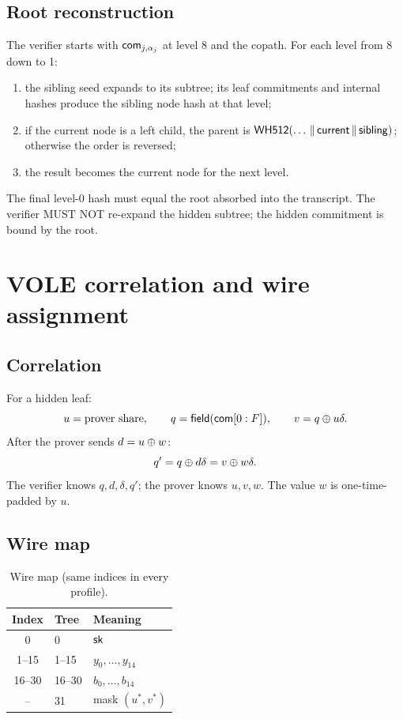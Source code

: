 \documentclass[11pt,a4paper]{article}
\begin{document}
\subsection{Root reconstruction}

The verifier starts with $\mathsf{com}_{j,\alpha_j}$ at level 8 and the copath. For
each level from 8 down to 1:
\begin{enumerate}
  \item the sibling seed expands to its subtree; its leaf commitments and
        internal hashes produce the sibling node hash at that level;
  \item if the current node is a left child, the parent is
        $\mathsf{WH512}(\ldots\,\|\,\mathsf{current}\,\|\,\mathsf{sibling})$;
        otherwise the order is reversed;
  \item the result becomes the current node for the next level.
\end{enumerate}
The final level-0 hash must equal the root absorbed into the transcript.
The verifier MUST NOT re-expand the hidden subtree; the hidden commitment is
bound by the root.

\section{VOLE correlation and wire assignment}

\subsection{Correlation}

For a hidden leaf:
\[
u=\text{prover share},\qquad
q=\mathsf{field}(\mathsf{com}[0:F]),\qquad
v=q\oplus u\delta.
\]
After the prover sends $d=u\oplus w$:
\[
q'=q\oplus d\delta=v\oplus w\delta.
\]
The verifier knows $q,d,\delta,q'$; the prover knows $u,v,w$. The value $w$ is
one-time-padded by $u$.

\subsection{Wire map}

\begin{table}[ht]
\centering
\small
\caption{Wire map (same indices in every profile).}
\label{tab:wiremap}
\begin{tabular}{@{}cll@{}}
\toprule
Index & Tree & Meaning \\
\midrule
0 & 0 & $\mathsf{sk}$ \\
1--15 & 1--15 & $y_0,\ldots,y_{14}$ \\
16--30 & 16--30 & $b_0,\ldots,b_{14}$ \\
-- & 31 & mask $(u^\ast,v^\ast)$ \\
\bottomrule
\end{tabular}
\end{table}
\end{document}
